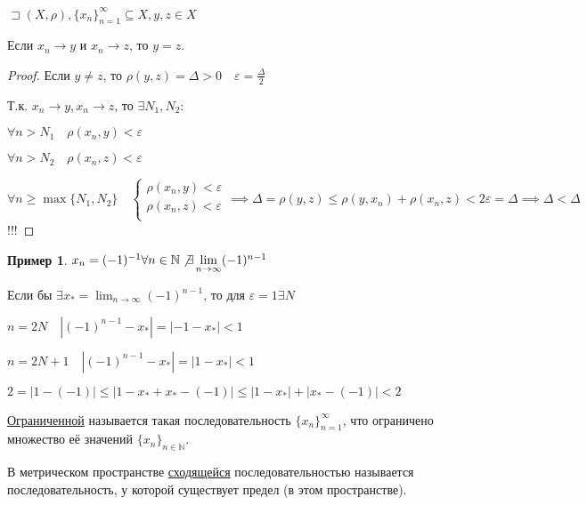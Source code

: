 \documentclass{book}
\newcommand\N{\ensuremath{\mathbb{N}}}
\theoremstyle{definition}
\newtheorem*{example}{Пример}
\begin{document}
    \begin{statement}
        $\sqsupset (X, \rho), \{x_n\}_{n=1}^{\infty }\subseteq X, y, z\in X $

        Если $x_n\to y$ и $x_n\to z$, то $y=z$.
    \end{statement}
    \begin{proof}
        Если $y\neq z$, то $\rho(y,z) = \Delta>0\quad \varepsilon = \frac{\Delta}{2}$

        Т.к. $x_n \to y, x_{n} \to z$, то $\exists N_1, N_2:$

        $\forall n>N_1\quad \rho(x_n,y)<\varepsilon$

        $\forall n>N_2\quad \rho(x_n,z)<\varepsilon$

        $\forall n\geqslant \max\{N_1, N_2\}\quad 
        \begin{cases}
            \rho(x_{n} , y)<\varepsilon \\
            \rho(x_{n} , z)<\varepsilon\\
        \end{cases} \implies  \Delta = \rho(y,z) \leqslant  \rho(y, x_{n}) + \rho(x_{n} , z)<2\varepsilon = \Delta \implies \Delta<\Delta $ !!!
    \end{proof}
    \begin{example}
        $x_n = (-1)^{-1} \forall n\in \N  \not\exists \lim_{n \to \infty} (-1)^{n-1}$

        Если бы $\exists x_* = \lim_{n \to \infty} (-1)^{n-1}$, то для $\varepsilon = 1 \exists N$

        $n=2N\quad \left| (-1)^{n-1} - x_* \right| = |-1-x_*|<1 $

        $n=2N+1\quad \left| (-1)^{n-1} - x_* \right| = |1-x_*|<1 $

    $2 = |1 - (-1)|\leqslant |1-x_* + x_*-(-1)| \leqslant |1-x_*| + |x_* - (-1)| <2$
    \end{example}

    \begin{definition}
        \underline{Ограниченной} называется такая последовательность $\{x_n\}_{n=1}^{\infty}$, что ограничено множество её значений $\{x_n\}_{n\in \N}$. 
    \end{definition}

    \begin{definition}
        В метрическом пространстве \underline{сходящейся} последовательностью называется последовательность, у которой существует предел (в этом пространстве).
    \end{definition}
\end{document}
